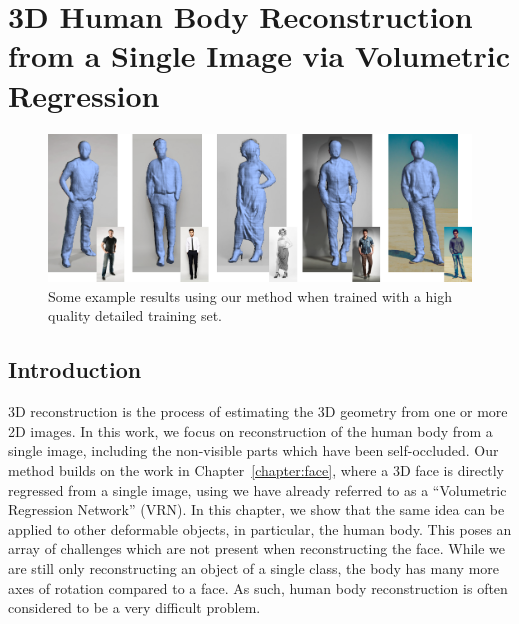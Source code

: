 \graphicspath{{chapter_humans/}}
\chapter{3D Human Body Reconstruction from a Single Image via
  Volumetric Regression}
\label{chapter:human}



\begin{figure}[h!]
  \centering
  \includegraphics[width=\linewidth]{img/demo.png}
  \caption[Example reconstructions]{Some example results using our
    method when trained with a high quality detailed training set.}
  \label{fig:topdemo}
\end{figure}


\section{Introduction}


3D reconstruction is the process of estimating the 3D geometry from
one or more 2D images. In this work, we focus on reconstruction of the
human body from a single image, including the non-visible parts which
have been self-occluded. Our method builds on the work in
Chapter~\ref{chapter:face}, where a 3D face is directly regressed from
a single image, using we have already referred to as a ``Volumetric
Regression Network'' (VRN). In this chapter, we show that the same
idea can be applied to other deformable objects, in particular, the
human body. This poses an array of challenges which are not present
when reconstructing the face. While we are still only reconstructing
an object of a single class, the body has many more axes of rotation
compared to a face. As such, human body reconstruction is often
considered to be a very difficult problem.

